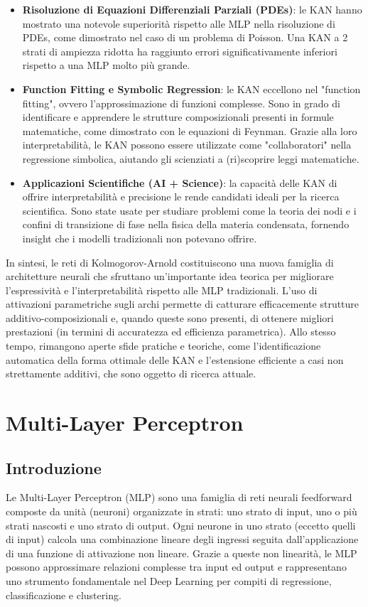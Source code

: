 \documentclass[a4paper,12pt]{report}
\begin{document}
	\begin{itemize}
		\item \textbf{Risoluzione di Equazioni Differenziali Parziali (PDEs)}: le KAN hanno mostrato una notevole superiorità rispetto alle MLP nella risoluzione di PDEs, come dimostrato nel caso di un problema di Poisson. Una KAN a 2 strati di ampiezza ridotta ha raggiunto errori significativamente inferiori rispetto a una MLP molto più grande.
		\item \textbf{Function Fitting e Symbolic Regression}: le KAN eccellono nel "function fitting", ovvero l'approssimazione di funzioni complesse. Sono in grado di identificare e apprendere le strutture composizionali presenti in formule matematiche, come dimostrato con le equazioni di Feynman. Grazie alla loro interpretabilità, le KAN possono essere utilizzate come "collaboratori" nella regressione simbolica, aiutando gli scienziati a (ri)scoprire leggi matematiche.
		\item \textbf{Applicazioni Scientifiche (AI + Science)}: la capacità delle KAN di offrire interpretabilità e precisione le rende candidati ideali per la ricerca scientifica. Sono state usate per studiare problemi come la teoria dei nodi e i confini di transizione di fase nella fisica della materia condensata, fornendo insight che i modelli tradizionali non potevano offrire.
	\end{itemize}
	
	In sintesi, le reti di Kolmogorov-Arnold costituiscono una nuova famiglia di architetture neurali che sfruttano un'importante idea teorica per migliorare l'espressività e l'interpretabilità rispetto alle MLP tradizionali. L'uso di attivazioni parametriche sugli archi permette di catturare efficacemente strutture additivo-composizionali e, quando queste sono presenti, di ottenere migliori prestazioni (in termini di accuratezza ed efficienza parametrica). Allo stesso tempo, rimangono aperte sfide pratiche e teoriche, come l'identificazione automatica della forma ottimale delle KAN e l'estensione efficiente a casi non strettamente additivi, che sono oggetto di ricerca attuale.
	
	\chapter{Multi-Layer Perceptron}
	
	\section{Introduzione}
	Le Multi-Layer Perceptron (MLP) sono una famiglia di reti neurali feedforward composte da unità (neuroni) organizzate in strati: uno strato di input, uno o più strati nascosti e uno strato di output. Ogni neurone in uno strato (eccetto quelli di input) calcola una combinazione lineare degli ingressi seguita dall'applicazione di una funzione di attivazione non lineare. Grazie a queste non linearità, le MLP possono approssimare relazioni complesse tra input ed output e rappresentano uno strumento fondamentale nel Deep Learning per compiti di regressione, classificazione e clustering.
	
\end{document}
